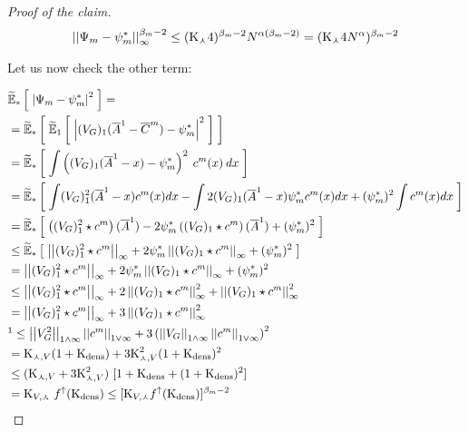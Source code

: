 \begin{proof}[Proof of the claim]
		\begin{align*}
			\left|\left| \Psi_m - \psi_m^\ast  \right|\right|_\infty^{\beta_m - 2} 
			\leq 
				(\text{K}_\curlywedge 4 )^{\beta_m -2} N^{\alpha (\beta_m -2)}
			=
				(\text{K}_\curlywedge 4 N^\alpha)^{\beta_m -2}
		\end{align*}
		
		Let us now check the other term:
		
		\begin{align*}
			&\ETFoot{\ast}{\norm{\Psi_m - \psi_m^\ast }^{2} } =
			\\
			&= \ETFoot{\ast}{
				\ETFoot{1}{
					\norm{
						(\genAttraction)_1(\mfamba^1 - \mfcamp^m)
						- \psi_m^\ast }^{2}
				}
			}
			\\
			&=
			\ETFoot{\ast}{
				\int
				\left(
				(\genAttraction)_1(\mfamba^1 - x)
				- \psi_m^\ast \right)^{2}
				\:
				\cdens^m(x)
				\:
				dx
			}
			\\
			& = \ETFoot{\ast}{
				\int
				(\genAttraction)_1^2(\mfamba^1 - x)
				\cdens^m(x)
				dx
				- \int 2
				(\genAttraction)_1(\mfamba^1 - x)
				\psi_m^\ast
				\cdens^m(x)
				dx
				+
				(\psi_m^\ast)^2
				\int
				\cdens^m(x)
				dx
			}
			\\
			&= \ETFoot{\ast}{
				\left( (\genAttraction)_1^2 \star \cdens^m \right) (\mfamba^1)
				- 2 \psi_m^\ast \left( (\genAttraction)_1 \star \cdens^m \right) (\mfamba^1)
				+(\psi_m^\ast)^2
			}
			\\
			& \leq \ETFoot{\ast}{
				\Norm{(\genAttraction)_1^2 \star \cdens^m}_\infty
				+ 2 \psi_m^\ast \Norm{(\genAttraction)_1 \star \cdens^m}_\infty
				+(\psi_m^\ast)^2
			}
			\\
			&= \Norm{(\genAttraction)_1^2 \star \cdens^m}_\infty
			+ 2 \psi_m^\ast \Norm{(\genAttraction)_1 \star \cdens^m}_\infty
			+(\psi_m^\ast)^2 
			\\
			&\leq 
			\Norm{(\genAttraction)_1^2 \star \cdens^m}_\infty
			+ 2\Norm{(\genAttraction)_1 \star \cdens^m}_\infty^2
			+ \Norm{(\genAttraction)_1 \star \cdens^m}_\infty^2
			\\
			& = 
			\Norm{(\genAttraction)_1^2 \star \cdens^m}_\infty
			+ 3\Norm{(\genAttraction)_1 \star \cdens^m}_\infty^2
			\qquad \text{}
			\\
			&\footnotemark[1]
			\leq
			\Norm{\genAttraction^2}_{1 \wedge \infty}
			\Norm{\cdens^m}_{1 \vee \infty}
			+ 3 
			\left(
			\Norm{\genAttraction}_{1 \wedge \infty}
			\Norm{\cdens^m}_{1 \vee \infty}
			\right)^2
			\\
			& =
			\const_{\curlywedge,\attraction} (1 + \const_{\text{dens}})
			+ 3 \const_{\curlywedge,\attraction}^2 (1 + \const_{\text{dens}})^2
			\\
			&
			\leq
				(\const_{\curlywedge,\attraction} + 3 \const_{\curlywedge,\attraction}^2)\
				[1 + \const_{\text{dens}} + (1 + \const_{\text{dens}})^2 ]
			\\
			& = 
				\const_{\attraction, \curlywedge}\
				\Fup(\const_\dens)
			\leq 
				[
					\const_{\attraction, \curlywedge}\Fup(\const_\dens)
				]^{\beta_m -2}
		\end{align*}
		

\end{proof}
